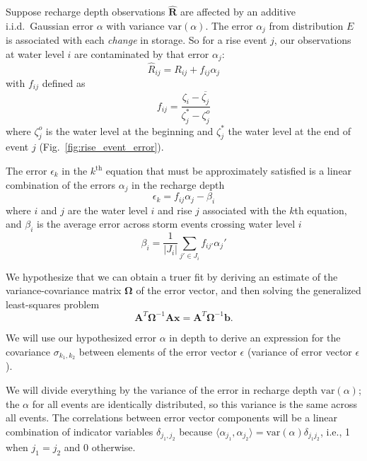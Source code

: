 \documentclass[11pt,a4paper]{article}
\renewcommand{\vec}[1]{\mathbf{#1}}
\begin{document}
Suppose recharge depth observations $\widehat{\mathbf{R}}$ are
affected by an additive i.i.d.\ Gaussian error $\mathbb\alpha$ with
variance $\text{var}(\alpha)$.  The error $\alpha_j$ from distribution
$E$ is associated with each \emph{change} in storage.  So for a rise
event $j$, our observations at water level $i$ are contaminated by
that error $\alpha_j$:
\begin{equation}
  \widehat{R}_{ij} = R_{ij} + f_{ij}\alpha_j
\end{equation}
with $f_{ij}$ defined as
\begin{equation}
f_{ij} = \frac{\zeta_i - \overline{\zeta_j}}{\zeta_j^* - \zeta^o_j}
\end{equation}
where $\zeta^o_j$ is the water level at the beginning and $\zeta^*_j$
the water level at the end of event $j$
(Fig.~\ref{fig:rise_event_error}).

The error $\epsilon_k$ in the $k^\text{th}$ equation that must be
approximately satisfied is a linear combination of the errors
$\alpha_j$ in the recharge depth
\begin{equation}
  \label{eq:epsilon_k}
  \epsilon_k = f_{ij}\alpha_j - \beta_i
\end{equation}
where $i$ and $j$ are the water level $i$ and rise $j$ associated with
the $k$th equation, and $\beta_i$ is the average error across storm
events crossing water level $i$
\begin{equation}
  \label{eq:beta_i}
  \beta_i = \frac{1}{|J_i|}\sum_{j' \in J_i} f_{ij'} \alpha_j'
\end{equation}

We hypothesize that we can obtain a truer fit by deriving an estimate
of the variance-covariance matrix $\bm{\Omega}$ of the error vector,
and then solving the generalized least-squares problem
\begin{equation}
  \vec{A}^T \bm{\Omega}^{-1} \vec{A} \vec{x} = \vec{A}^T \bm{\Omega}^{-1} \vec{b}.
\end{equation}

We will use our hypothesized error $\alpha$ in depth to derive an
expression for the covariance $\sigma_{k_1,k_2}$ between elements of
the error vector $\epsilon$ (variance of error vector $\epsilon$).

We will divide everything by the variance of the error in recharge
depth $\text{var}(\alpha)$; the $\alpha$ for all events are
identically distributed, so this variance is the same across all
events. The correlations between error vector components will be a
linear combination of indicator variables $\delta_{j_1,j_2}$ because
$\langle\alpha_{j_1},\alpha_{j_2}\rangle = \text{var}(\alpha)
\delta_{j_1 j_2}$, i.e., 1 when $j_1=j_2$ and 0 otherwise.
\end{document}
